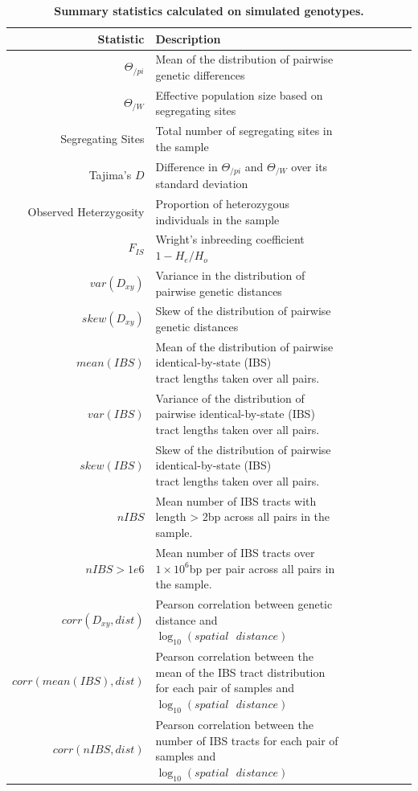 \documentclass[10pt,twoside,lineno,hidelinks]{preprint}
\begin{document}
\begin{table}
\small
\centering
\caption{\bf Summary statistics calculated on simulated genotypes.}
\begin{tabular}{rllrrrrr}
  \hline
Statistic & Description \\ 
  \hline
$\Theta_{/pi}$ & Mean of the distribution of pairwise genetic differences \\
$\Theta_{/W}$ & Effective population size based on segregating sites \\
Segregating Sites & Total number of segregating sites in the sample \\
Tajima's $D$ & Difference in $\Theta_{/pi}$ and $\Theta_{/W}$ over its standard deviation\\
Observed Heterzygosity & Proportion of heterozygous individuals in the sample \\
$F_{IS}$ & Wright's inbreeding coefficient $1-H_{e}/H_{o}$ \\
$var(D_{xy})$ & Variance in the distribution of pairwise genetic distances \\
$skew(D_{xy})$ & Skew of the distribution of pairwise genetic distances \\
$mean(IBS)$ & \makecell[l]{Mean of the distribution of pairwise identical-by-state (IBS) \\tract lengths taken over all pairs.} \\
$var(IBS)$ & \makecell[l]{Variance of the distribution of pairwise identical-by-state (IBS) \\tract lengths taken over all pairs.} \\
$skew(IBS)$ & \makecell[l]{Skew of the distribution of pairwise identical-by-state (IBS) \\tract lengths taken over all pairs.} \\
$nIBS$ & Mean number of IBS tracts with length > 2bp across all pairs in the sample. \\
$nIBS>1e6$ & \makecell[l]{Mean number of IBS tracts over $1\times10^6$bp per pair \\across all pairs in the sample.} \\ 
$corr(D_{xy},dist)$ & Pearson correlation between genetic distance and $\log_{10}(spatial\text{ }distance)$ \\
$corr(mean(IBS),dist)$ & \makecell[l]{Pearson correlation between the mean of the IBS tract distribution \\for each pair of samples and $\log_{10}(spatial\text{ }distance)$} \\
$corr(nIBS,dist)$ & \makecell[l]{Pearson correlation between the number of IBS tracts \\for each pair of samples and $\log_{10}(spatial\text{ }distance)$} \\

\end{tabular}
\end{table}
\end{document}
